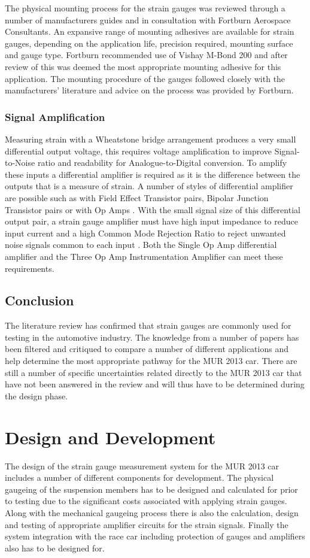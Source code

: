 The physical mounting process for the strain gauges was reviewed through a number of manufacturers guides \cite{Text_11}\cite{Text_12} and in consultation with Fortburn Aerospace Consultants. An expansive range of mounting adhesives are available for strain gauges, depending on the application life, precision required, mounting surface and gauge type. Fortburn recommended use of Vishay M-Bond 200 and after review of \cite{Text_11} this was deemed the most appropriate mounting adhesive for this application. The mounting procedure of the gauges followed closely with the manufacturers' literature and advice on the process was provided by Fortburn. 

\subsubsection{Signal Amplification}
Measuring strain with a Wheatstone bridge arrangement produces a very small differential output voltage, this requires voltage amplification to improve Signal-to-Noise ratio and readability for Analogue-to-Digital conversion. To amplify these inputs a differential amplifier is required as it is the difference between the outputs that is a measure of strain. A number of styles of differential amplifier are possible such as with Field Effect Transistor pairs, Bipolar Junction Transistor pairs or with Op Amps \cite{Text_16}. With the small signal size of this differential output pair, a strain gauge amplifier must have high input impedance to reduce input current and a high Common Mode Rejection Ratio to reject unwanted noise signals common to each input \cite{Text_17}. Both the Single Op Amp differential amplifier and the Three Op Amp Instrumentation Amplifier can meet these requirements.

\subsection{Conclusion}
The literature review has confirmed that strain gauges are commonly used for testing in the automotive industry. The knowledge from a number of papers has been filtered and critiqued to compare a number of different applications and help determine the most appropriate pathway for the MUR 2013 car. There are still a number of specific uncertainties related directly to the MUR 2013 car that have not been answered in the review and will thus have to be determined during the design phase.


\section{Design and Development}
The design of the strain gauge measurement system for the MUR 2013 car includes a number of different components for development. The physical gaugeing of the suspension members has to be designed and calculated for prior to testing due to the significant costs associated with applying strain gauges. Along with the mechanical gaugeing process there is also the calculation, design and testing of appropriate amplifier circuits for the strain signals. Finally the system integration with the race car including protection of gauges and amplifiers also has to be designed for.

